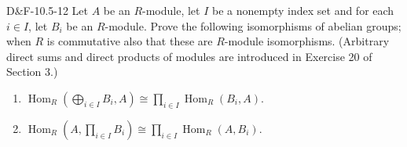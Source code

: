\documentclass{article}
\begin{document}
	\begin{prb}{D\&F-10.5-12}
		Let $A$ be an $R$-module, let $I$ be a nonempty index set and for each $i \in I$, let $B_{i}$ be an $R$-module. Prove the following isomorphisms of abelian groups; when $R$ is commutative also that these are $R$-module isomorphisms. (Arbitrary direct sums and direct products of modules are introduced in Exercise 20 of Section 3.) \vspace{-0.25cm}
		\begin{enumerate}[itemsep =-2pt,label = \textbf{(\alph{*})}]
			\item $\operatorname{Hom}_{R}(\bigoplus_{i \in I}B_{i}, A) \cong \prod_{i \in I}\operatorname{Hom}_{R}(B_{i},A)$. 
			\item $\operatorname{Hom}_{R}(A, \prod_{i \in I}B_{i}) \cong \prod_{i \in I}\operatorname{Hom}_{R}(A, B_{i})$. 
		\end{enumerate}
	\end{prb}
	
\end{document}
